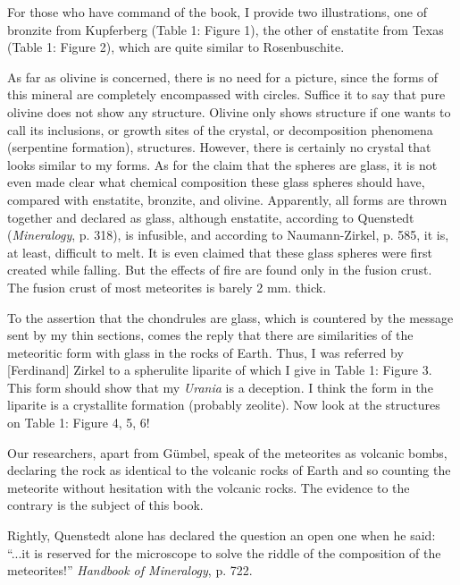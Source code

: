 \documentclass[a4paper, 12pt, oneside]{article}
\begin{document}
For those who have command of the book, I provide two illustrations, one of bronzite from Kupferberg (Table 1: Figure 1), the other of enstatite from Texas (Table 1: Figure 2), which are quite similar to Rosenbuschite.

As far as olivine is concerned, there is no need for a picture, since the forms of this mineral are completely encompassed with circles. Suffice it to say that pure olivine does not show any structure. Olivine only shows structure if one wants to call its inclusions, or growth sites of the crystal, or decomposition phenomena (serpentine formation), structures. However, there is certainly no crystal that looks similar to my forms. As for the claim that the spheres are glass, it is not even made clear what chemical composition these glass spheres should have, compared with enstatite, bronzite, and olivine. Apparently, all forms are thrown together and declared as glass, although enstatite, according to Quenstedt (\emph{Mineralogy}, p. 318), is infusible, and according to Naumann-Zirkel, p. 585, it is, at least, difficult to melt. It is even claimed that these glass spheres were first created while falling. But the effects of fire are found only in the fusion crust. The fusion crust of most meteorites is barely 2 mm. thick.

To the assertion that the chondrules are glass, which is countered by the message sent by my thin sections, comes the reply that there are similarities of the meteoritic form with glass in the rocks of Earth. Thus, I was referred by [Ferdinand] Zirkel to a spherulite liparite of which I give in Table 1: Figure 3. This form should show that my \emph{Urania} is a deception. I think the form in the liparite is a crystallite formation (probably zeolite). Now look at the structures on Table 1: Figure 4, 5, 6!

Our researchers, apart from Gümbel, speak of the meteorites as volcanic bombs, declaring the rock as identical to the volcanic rocks of Earth and so counting the meteorite without hesitation with the volcanic rocks. The evidence to the contrary is the subject of this book.

Rightly, Quenstedt alone has declared the question an open one when he said: ``...it is reserved for the microscope to solve the riddle of the composition of the meteorites!'' \emph{Handbook of Mineralogy}, p. 722.
\clearpage
\end{document}
